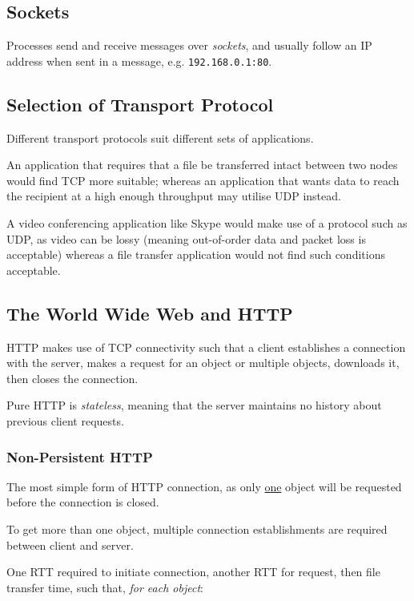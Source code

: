 \documentclass{article}
\begin{document}
\subsection{Sockets}

Processes send and receive messages over \textit{sockets}, and usually follow an IP address when sent in a message, e.g. \texttt{192.168.0.1:80}. 

\subsection{Selection of Transport Protocol}

Different transport protocols suit different sets of applications. 

An application that requires that a file be transferred intact between two nodes would find TCP more suitable; whereas an application that wants data to reach the recipient at a high enough throughput may utilise UDP instead.

A video conferencing application like Skype would make use of a protocol such as UDP, as video can be lossy (meaning out-of-order data and packet loss is acceptable) whereas a file transfer application would not find such conditions acceptable.

\subsection{The World Wide Web and HTTP}

HTTP makes use of TCP connectivity such that a client establishes a connection with the server, makes a request for an object or multiple objects, downloads it, then closes the connection.

Pure HTTP is \textit{stateless}, meaning that the server maintains no history about previous client requests.

\subsubsection{Non-Persistent HTTP}

The most simple form of HTTP connection, as only \underline{one} object will be requested before the connection is closed.

To get more than one object, multiple connection establishments are required between client and server.

One RTT required to initiate connection, another RTT for request, then file transfer time, such that, \textit{for each object}:
\end{document}
